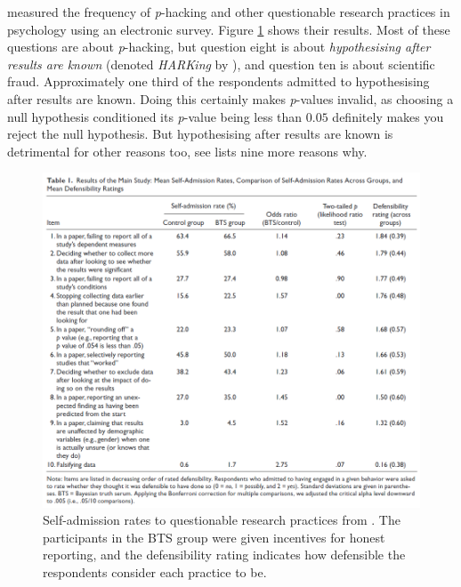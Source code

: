 \textcite{John2012-xp} measured the frequency of \emph{p}-hacking and other questionable research practices in psychology using an electronic survey. Figure \ref{fig:john2012} shows their results. Most of these questions are about \emph{p}-hacking, but question eight is about \emph{hypothesising after results are known} (denoted \emph{HARKing} by \textcite{Kerr1998-by}), and question ten is about scientific fraud. Approximately one third of the respondents admitted to hypothesising after results are known. Doing this certainly makes \emph{p}-values invalid, as choosing a null hypothesis conditioned its \emph{p}-value being less than $0.05$ definitely makes you reject the null hypothesis. But hypothesising after results are known is detrimental for other reasons too, see \textcite[p. 205]{Kerr1998-by} lists nine more reasons why.

\begin{figure}
\noindent \begin{centering}
\includegraphics[scale=0.4]{figures/john2012}
\par\end{centering}
\caption{\label{fig:john2012}Self-admission rates to questionable research practices from \textcite{John2012-xp}. The participants in the BTS group were given incentives for honest reporting, and the defensibility rating indicates how defensible the respondents consider each practice to be.}
\end{figure}

